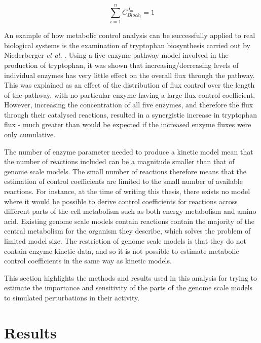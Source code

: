 \begin{equation}\label{summation_theorum}
\sum_{i=1}^{n}C_{Block_i}^{J_m} = 1
\end{equation}

An example of how metabolic control analysis can be successfully applied to real biological systems is the examination of tryptophan biosynthesis carried out by Niederberger \emph{et al.} \cite{Niederberger1992}. Using a five-enzyme pathway model involved in the production of tryptophan, it was shown that increasing/decreasing levels of individual enzymes has very little effect on the overall flux through the pathway. This was explained as an effect of the distribution of flux control over the length of the pathway, with no particular enzyme having a large flux control coefficient. However, increasing the concentration of all five enzymes, and therefore the flux through their catalysed reactions, resulted in a synergistic increase in tryptophan flux - much greater than would be expected if the increased enzyme fluxes were only cumulative.

The number of enzyme parameter needed to produce a kinetic model mean that the number of reactions included can be a magnitude smaller than that of genome scale models. The small number of reactions therefore means that the estimation of  control coefficients are limited to the small number of available reactions. For instance, at the time of writing this thesis, there exists no model where it would be possible to derive control coefficients for reactions across different parts of the cell metabolism such as both energy metabolism and amino acid. Existing genome scale models contain reactions contain the majority of the central metabolism for the organism they describe, which solves the problem of limited model size. The restriction of genome scale models is that they do not contain enzyme kinetic data, and so it is not possible to estimate metabolic control coefficients in the same way as kinetic models.

This section highlights the methods and results used in this analysis for trying to estimate the importance and sensitivity of the parts of the genome scale models to simulated perturbations in their activity.

\section{Results}

